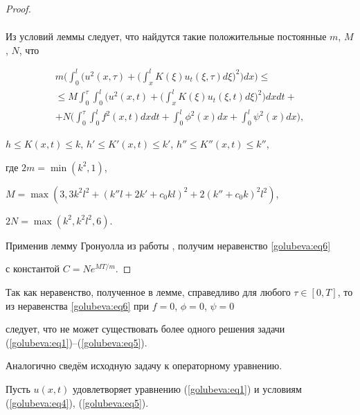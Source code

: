 \begin{proof}
\begin{multline*}
\end{multline*}



Из условий леммы следует, что найдутся такие положительные постоянные $m$, $M$, $N$, что

\begin{multline*}

m\biggl(\int _{0}^{l}\biggl(u^{2}(x, \tau )+\biggl(\int _{x}^{l}K(\xi )u_{t}(\xi , \tau )d\xi \biggr)^{2} \biggr)dx \biggr)\leq\\

\leq M\int _{0}^{\tau }\int _{0}^{l} \biggl(u^{2}(x, t)+\biggl(\int _{x}^{l}K(\xi )u_{t}(\xi , t)d\xi \biggr)^{2}\biggr)dxdt+\\

+N \biggl(\int _{0}^{\tau }\int _{0}^{l}f^{2}(x, t)dxdt+\int _{0}^{l}\phi ^{2}(x)dx+\int _{0}^{l}\psi ^{2}(x)dx \biggr),

\end{multline*}

$h\leq K(x, t)\leq k$,  $h'\leq K'(x, t)\leq k'$, $h'' \leq K'' (x, t) \leq k''$,

где $2m=\min(k^{2}, 1)$,

$M=\max(3, 3k^{2}l^{2}+(k''l+2k'+c_{0}kl)^{2}+2(k''+c_{0}k)^{2}l^{2})$,

$2N=\max(k^{2}, k^{2}l^{2}, 6).$



Применив лемму Гронуолла из работы  \cite{golubeva:bib5}, получим неравенство \eqref{golubeva:eq6}

с константой $C=Ne^{{MT}/{m}}$.\end{proof}

\smallskip




Так как неравенство, полученное в лемме, справедливо для любого $\tau \in [0, T]$, то из неравенства \eqref{golubeva:eq6} при $f=0$, $\phi =0$, $\psi =0$

 следует, что не может существовать более одного решения задачи (\ref{golubeva:eq1})--(\ref{golubeva:eq5}).



Аналогично \cite{golubeva:bib1} сведём исходную задачу к операторному уравнению.



 Пусть $u(x, t)$ удовлетворяет уравнению (\ref{golubeva:eq1}) и условиям (\ref{golubeva:eq4}), (\ref{golubeva:eq5}).

